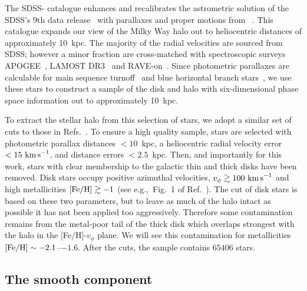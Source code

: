 \documentclass[prd,10pt,twocolumn,showpacs,nofootinbib,aps,superscriptaddress,preprintnumbers]{revtex4-1}
\newcommand{\kms}{\textrm{ km \!s}^{-1}}
\newcommand{\Gaia}{\!{\it Gaia}\xspace}
\begin{document}
 The SDSS-\Gaia catalogue enhances and recalibrates the astrometric
 solution of the SDSS's 9th data release~\cite{Ahn:2012fh} with
 parallaxes and proper motions from \Gaia~\cite{Gaia:2016,Brown:2016tnb}. 
 This catalogue expands our view of
 the Milky Way halo out to heliocentric distances of approximately
 10~kpc. The majority of the radial velocities are sourced from SDSS; however a minor fraction are cross-matched with
 spectroscopic surveys APOGEE~\cite{Anders:2013gna}, LAMOST
 DR3~\cite{Luo15} and RAVE-on~\cite{Casey:2017,RAVE5}. Since photometric parallaxes are calculable for main
 sequence turnoff~\cite{Ivezic:2008wk} and blue horizontal branch
 stars~\cite{Deason:2011wt}, we use these stars to construct a
 sample of the disk and halo with six-dimensional phase space information
 out to approximately 10~kpc.

 To extract the stellar halo from this selection of stars, we adopt a
 similar set of cuts to those in
 Refs.~\cite{Myeong:2017skt,Myeong:Preprint}.  To ensure a high quality
 sample, stars are selected with photometric parallax distances
 \mbox{$<10$~kpc}, a heliocentric radial velocity error \mbox{$<15
   \kms$}, and distance errors \mbox{$<2.5$~kpc}. 
    Then, and importantly
 for this work, stars with clear membership to the galactic thin and
 thick disks have been removed. Disk stars occupy positive azimuthal
 velocities, $v_\phi \gtrsim 100 \kms$ and high metallicities $[{\rm
     Fe/H}] \gtrsim -1$ (see e.g.,\ Fig.~1 of
 Ref.~\cite{Myeong:2017skt}). The cut of disk stars is based on these two parameters, but to leave as much of the halo intact as possible it has not been applied too aggressively. Therefore some contamination remains from the metal-poor tail of the thick disk which overlaps strongest with the halo in the [Fe/H]-$v_\phi$ plane. We will see this contamination for metallicities $[{\rm Fe/H}]\sim -2.1$--$-1.6$. After the cuts, the sample contains $65406$ stars.

 \subsection{The smooth component}
\end{document}
